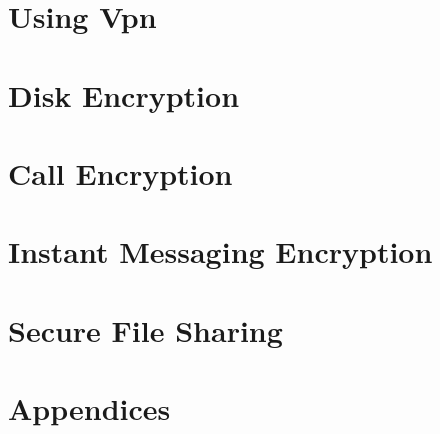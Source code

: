 \documentclass[oribibl]{scrbook}
\begin{document}
\chapter{Using Vpn}
\clearpage

\clearpage

\clearpage

\clearpage

\clearpage

\graphicspath{{./chapter_10_disk_encryption/}}
\chapter{Disk Encryption}
\clearpage

\clearpage

\clearpage

\clearpage

\graphicspath{{./chapter_11_call_encryption/}}
\chapter{Call Encryption}
\clearpage

\graphicspath{{./chapter_12_instant_messaging_encryption/}}
\chapter{Instant Messaging Encryption}
\clearpage

\graphicspath{{./chapter_13_secure_file_sharing/}}
\chapter{Secure File Sharing}
\clearpage

\graphicspath{{./chapter_14_appendices/}}
\chapter{Appendices}
\clearpage

\clearpage

\clearpage

\end{document}

